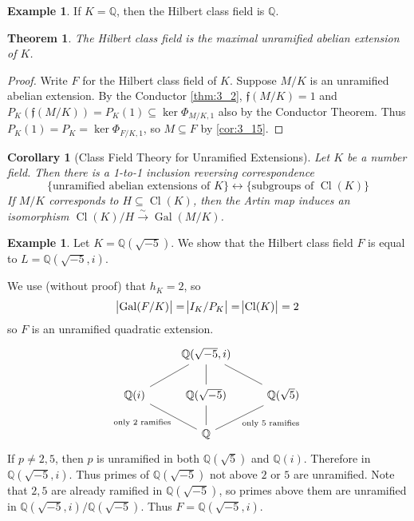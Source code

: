 \documentclass[11pt]{article}
\theoremstyle{definition}
\newtheorem{example}[definition]{Example}
\theoremstyle{plain}
\newtheorem{theorem}[definition]{Theorem}
\newtheorem{corollary}[definition]{Corollary}
\theoremstyle{remark}
\DeclareMathOperator{\Gal}{Gal}
\DeclareMathOperator{\Cl}{Cl}
\newcommand{\QQ}{\mathbb{Q}}
\newcommand{\ff}{\mathfrak{f}}
\begin{document}
\begin{example}\label{eg:4_4}
    If $K = \QQ$, then the Hilbert class field is $\QQ$.
\end{example}

\begin{theorem}\label{thm:4_5}
    The Hilbert class field is the maximal unramified abelian extension of $K$.
\end{theorem}
\begin{proof}
    Write $F$ for the Hilbert class field of $K$. Suppose $M/K$ is an unramified abelian extension. By the Conductor \autoref{thm:3_2}, $\ff(M/K) = 1$ and $P_K(\ff(M/K)) = P_K(1) \subseteq \ker \Phi_{M/K, 1}$ also by the Conductor Theorem. Thus $P_K(1) = P_K = \ker \Phi_{F/K, 1}$, so $M \subseteq F$ by \autoref{cor:3_15}.
\end{proof}

\begin{corollary}[Class Field Theory for Unramified Extensions]\label{cor:4_6}
    Let $K$ be a number field. Then there is a 1-to-1 inclusion reversing correspondence
    \begin{equation*}
        \{\text{unramified abelian extensions of } K\} \longleftrightarrow \{\text{subgroups of } \Cl(K)\}
    \end{equation*}
    If $M/K$ corresponds to $H \subseteq \Cl(K)$, then the Artin map induces an isomorphism $\Cl(K)/H \xrightarrow{\sim} \Gal(M/K)$.
\end{corollary}

\begin{example}\label{eg:4_7}
    Let $K = \QQ(\sqrt{-5})$. We show that the Hilbert class field $F$ is equal to $L = \QQ(\sqrt{-5}, i)$.

    We use (without proof) that $h_K = 2$, so
    \begin{equation*}
        \abs{\Gal(F/K)} = \abs{I_K/P_K} = \abs{\Cl(K)} = 2
    \end{equation*}
    so $F$ is an unramified quadratic extension.
    \begin{equation*}
    \begin{tikzcd}
        & \QQ(\sqrt{-5}, i) \arrow[dl, dash] \arrow[d, dash] \arrow[dr, dash] &\\
        \QQ(i) \arrow[dr, dash, "\text{only } 2 \text{ ramifies}"'] & \QQ(\sqrt{-5}) \arrow[d, dash] & \QQ(\sqrt{5}) \arrow[dl, dash, "\text{only } 5 \text{ ramifies}"]\\
        & \QQ
    \end{tikzcd}
    \end{equation*}
    If $p \neq 2, 5$, then $p$ is unramified in both $\QQ(\sqrt{5})$ and $\QQ(i)$. Therefore in $\QQ(\sqrt{-5}, i)$. Thus primes of $\QQ(\sqrt{-5})$ not above $2$ or $5$ are unramified. Note that $2, 5$ are already ramified in $\QQ(\sqrt{-5})$, so primes above them are unramified in $\QQ(\sqrt{-5}, i)/\QQ(\sqrt{-5})$. Thus $F = \QQ(\sqrt{-5}, i)$.
\end{example}
\end{document}
